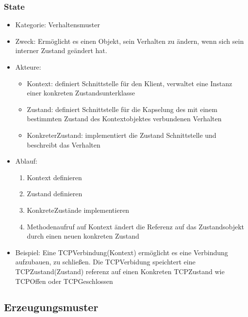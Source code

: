 \documentclass[11pt, fleqn, a4paper, leqno]{scrartcl} %
\begin{document}
		\subsubsection{State}
			\begin{itemize}
				\item Kategorie: Verhaltensmuster
				\item Zweck: Ermöglicht es einen Objekt, sein Verhalten zu ändern, wenn sich sein interner Zustand geändert hat.
				\item Akteure: 
					\begin{itemize}
						\item Kontext: definiert Schnittstelle für den Klient, verwaltet eine Instanz einer konkreten Zustandsunterklasse
						\item Zustand: definiert Schnittstelle für die Kapselung des mit einem bestimmten Zustand des Kontextobjektes verbundenen Verhalten
						\item KonkreterZustand: implementiert die Zustand Schnittstelle und beschreibt das Verhalten
					\end{itemize}
				\item Ablauf:
					\begin{enumerate}
						\item Kontext definieren
						\item Zustand definieren
						\item KonkreteZustände implementieren
						\item Methodenaufruf auf Kontext ändert die Referenz auf das Zustandsobjekt durch einen neuen konkreten Zustand
					\end{enumerate}
				\item Beispiel: Eine TCPVerbindung(Kontext) ermöglicht es eine Verbindung aufzubauen, zu schließen. Die TCPVerbidung speichtert eine TCPZustand(Zustand) referenz auf einen Konkreten TCPZustand wie TCPOffen oder TCPGeschlossen
			\end{itemize}
			\newpage
		\subsection{Erzeugungsmuster}
\end{document}
